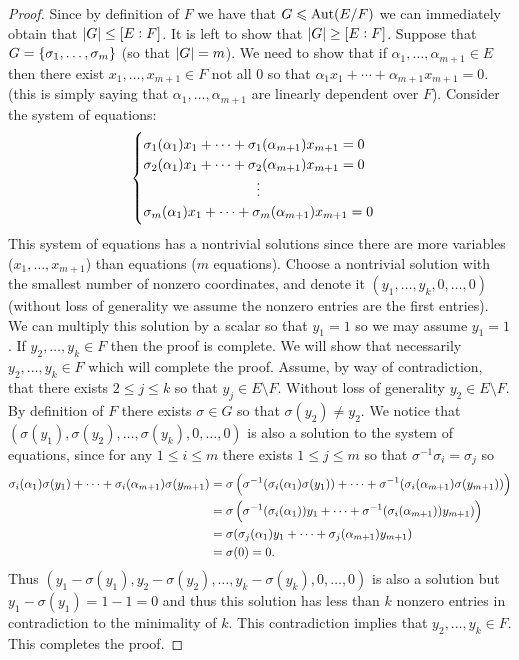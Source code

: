 \documentclass[11pt,a4paper]{article}
\begin{document}
\begin{proof}
  Since by definition of $F$
  we have that $G \leqslant \operatorname{Aut}(E/F)$ we can immediately obtain that
  $\left\lvert G\right\rvert \le [E : F]$.
  It is left to show that $\left\lvert G\right\rvert \geq [E : F]$.
  Suppose that $G = \left\{\sigma_1,\dots,\sigma_m\right\}$ (so that $\left\lvert G\right\rvert = m$).
  We need to show that if $\alpha_1,\dots,\alpha_{m+1} \in E$
  then there exist $x_1,\dots,x_{m+1} \in F$
  not all $0$ so that $\alpha_1 x_1 + \cdots + \alpha_{m+1} x_{m+1} = 0$.
  (this is simply saying that $\alpha_1,\dots,\alpha_{m+1}$
  are linearly dependent over $F$).
  Consider the system of equations:
  \[
    \begin{cases}
      \sigma_1(\alpha_1) x_1 + \cdots + \sigma_1(\alpha_{m+1}) x_{m+1} = 0 \\
      \sigma_2(\alpha_1) x_1 + \cdots + \sigma_2(\alpha_{m+1}) x_{m+1} = 0 \\
      \vdotswithin{
      \sigma_m(\alpha_1) x_1 + \cdots + \sigma_m(\alpha_{m+1}) x_{m+1} = 0} \\
      \sigma_m(\alpha_1) x_1 + \cdots + \sigma_m(\alpha_{m+1}) x_{m+1} = 0
    \end{cases}
  \]
  This system of equations has a nontrivial solutions since there are
  more variables ($x_1,\dots,x_{m+1}$) than equations ($m$ equations).
  Choose a nontrivial solution with the smallest number of nonzero
  coordinates, and denote it $(y_1,\dots,y_k,0,\dots,0)$
  (without loss of generality
  we assume the nonzero entries are the first entries).
  We can multiply this solution by a scalar so that $y_1 = 1$
  so we may assume $y_1 = 1$.
  If $y_2,\dots,y_k \in F$ then the proof is complete.
  We will show that necessarily $y_2,\dots,y_k \in F$
  which will complete the proof.
  Assume, by way of contradiction, that there exists $2 \le j \le k$ so that
  $y_j \in E \setminus F$.
  Without loss of generality $y_2 \in E \setminus F$.
  By definition of $F$
  there exists $\sigma \in G$ so that $\sigma(y_2) \neq y_2$.
  We notice that $(\sigma(y_1),\sigma(y_2),\dots,\sigma(y_k),0,\dots,0)$
  is also a solution to the system of equations,
  since for any $1 \le i \le m$ there exists $1 \le j \le m$
  so that $\sigma^{-1} \sigma_i = \sigma_j$ so
  \begin{align*}
  \sigma_i(\alpha_1) \sigma(y_1) + \cdots +
  \sigma_i(\alpha_{m+1}) \sigma(y_{m+1}) &=
  \sigma\del{\sigma^{-1} (\sigma_i(\alpha_1) \sigma(y_1)) + \cdots +
  \sigma^{-1} (\sigma_i(\alpha_{m+1}) \sigma(y_{m+1}))} \\ &=
  \sigma\del{\sigma^{-1} (\sigma_i(\alpha_1)) y_1 + \cdots +
  \sigma^{-1} (\sigma_i(\alpha_{m+1})) y_{m+1})} \\ &=
  \sigma(\sigma_j(\alpha_1) y_1 + \cdots +
  \sigma_j(\alpha_{m+1}) y_{m+1}) \\ &=
  \sigma(0) = 0.
  \end{align*}
  Thus
  $(y_1 - \sigma(y_1),y_2 - \sigma(y_2),\dots,y_k - \sigma(y_k),0,\dots,0)$
  is also a solution but $y_1 - \sigma(y_1) = 1 - 1 = 0$
  and thus this solution has less than $k$ nonzero entries
  in contradiction to the minimality of $k$.
  This contradiction implies that $y_2,\dots,y_k \in F$.
  This completes the proof.
\end{proof}
\end{document}
